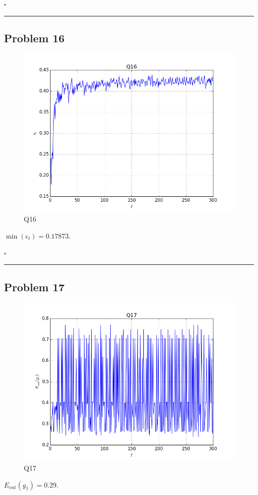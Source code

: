 \documentclass[12pt]{article}
\newcommand*{\QEDB}{\hfill\ensuremath{\square}}
\newcommand{\ParTh}[1]{\left(#1\right)}
\newcommand{\horrule}[1]{\rule{\linewidth}{#1}}
\begin{document}
\QEDB

\horrule{0.5pt}

\subsection*{Problem 16}

\begin{figure}[H]
	\centering
	\includegraphics[scale=0.5]{Q16.png}
	\caption{Q16}
	\label{Q16}
\end{figure}
$\min\ParTh{\epsilon_t}=0.17873$.

\QEDB

\horrule{0.5pt}

\subsection*{Problem 17}

\begin{figure}[H]
	\centering
	\includegraphics[scale=0.5]{Q17.png}
	\caption{Q17}
	\label{Q17}
\end{figure}
$E_{\text{out}}\ParTh{g_1}=0.29$.
\end{document}
